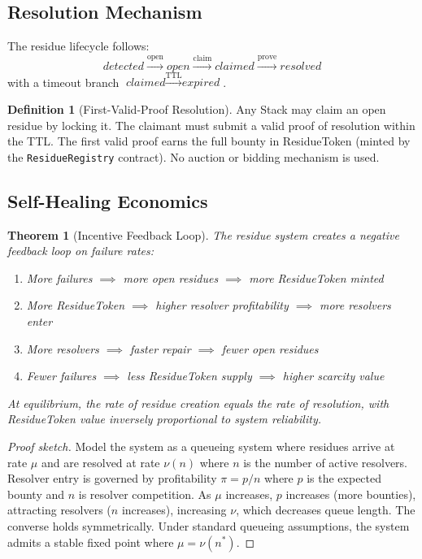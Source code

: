 \documentclass[11pt,twocolumn]{article}
\theoremstyle{definition}
\newtheorem{definition}{Definition}[section]
\theoremstyle{plain}
\newtheorem{theorem}{Theorem}[section]
\theoremstyle{remark}
\begin{document}
\subsection{Resolution Mechanism}

The residue lifecycle follows:
\begin{equation}
  \textit{detected} \xrightarrow{\text{open}} \textit{open} \xrightarrow{\text{claim}} \textit{claimed} \xrightarrow{\text{prove}} \textit{resolved}
\end{equation}
with a timeout branch $\textit{claimed} \xrightarrow{\text{TTL}} \textit{expired}$.

\begin{definition}[First-Valid-Proof Resolution]
Any Stack may claim an open residue by locking it. The claimant must submit a valid proof of resolution within the TTL. The first valid proof earns the full bounty in ResidueToken (minted by the \texttt{ResidueRegistry} contract). No auction or bidding mechanism is used.
\end{definition}

\subsection{Self-Healing Economics}

\begin{theorem}[Incentive Feedback Loop]\label{thm:feedback}
The residue system creates a negative feedback loop on failure rates:
\begin{enumerate}[leftmargin=*,itemsep=1pt]
  \item More failures $\implies$ more open residues $\implies$ more ResidueToken minted
  \item More ResidueToken $\implies$ higher resolver profitability $\implies$ more resolvers enter
  \item More resolvers $\implies$ faster repair $\implies$ fewer open residues
  \item Fewer failures $\implies$ less ResidueToken supply $\implies$ higher scarcity value
\end{enumerate}
At equilibrium, the rate of residue creation equals the rate of resolution, with ResidueToken value inversely proportional to system reliability.
\end{theorem}

\begin{proof}[Proof sketch]
Model the system as a queueing system where residues arrive at rate $\mu$ and are resolved at rate $\nu(n)$ where $n$ is the number of active resolvers. Resolver entry is governed by profitability $\pi = p / n$ where $p$ is the expected bounty and $n$ is resolver competition. As $\mu$ increases, $p$ increases (more bounties), attracting resolvers ($n$ increases), increasing $\nu$, which decreases queue length. The converse holds symmetrically. Under standard queueing assumptions, the system admits a stable fixed point where $\mu = \nu(n^*)$.
\end{proof}
\end{document}
